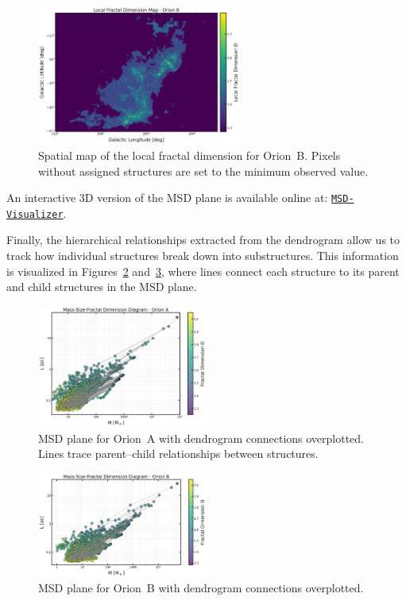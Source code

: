 \begin{figure}[t]
    \centering
    \includegraphics[width=0.6\textwidth]{figures/local_fractal_dimension_map_Orion_B.png}
    \caption{Spatial map of the local fractal dimension for Orion~B. Pixels without assigned structures are set to the minimum observed value.}
    \label{fig:local_B_map}
\end{figure}

An interactive 3D version of the MSD plane is available online at:  
\href{https://simonesped.github.io/MSD_Viz/}{\texttt{MSD-Visualizer}}.

Finally, the hierarchical relationships extracted from the dendrogram allow us to track how individual structures break down into substructures.  
This information is visualized in Figures~\ref{fig:MSD_orion_A_lines} and~\ref{fig:MSD_orion_B_lines}, where lines connect each structure to its parent and child structures in the MSD plane.

\begin{figure}[t]
    \centering
    \includegraphics[width=0.5\textwidth]{figures/MSD_Orion_A_with_lines.png}
    \caption{MSD plane for Orion~A with dendrogram connections overplotted. Lines trace parent--child relationships between structures.}
    \label{fig:MSD_orion_A_lines}
\end{figure}

\begin{figure}[t]
    \centering
    \includegraphics[width=0.5\textwidth]{figures/MSD_Orion_B_with_lines.png}
    \caption{MSD plane for Orion~B with dendrogram connections overplotted.}
    \label{fig:MSD_orion_B_lines}
\end{figure}

